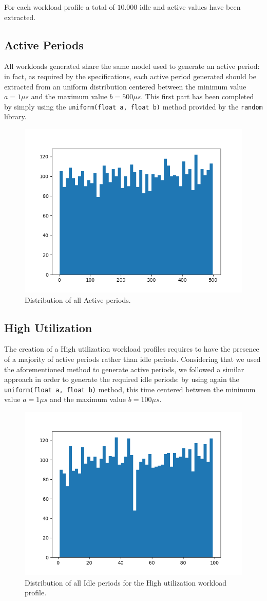 \documentclass[a4paper]{article}
\begin{document}
    For each workload profile a total of $10.000$ idle and active values have been extracted.

    \subsection{Active Periods}
        All workloads generated share the same model used to generate an active period: in fact, as required by the specifications, each active period generated should be extracted from an uniform distribution centered between the minimum value $a=1\mu s$ and the maximum value $b=500 \mu s$. This first part has been completed by simply using the \texttt{uniform(float a, float b)} method provided by the \texttt{random} library.
        \begin{figure}[htp]
            \centering
            \includegraphics[width=0.3 \columnwidth]{./screenshots/Active.png}
            \caption{
                    \label{fig:Active}
                    Distribution of all Active periods.
            }
        \end{figure}
    \subsection{High Utilization}
        The creation of a High utilization workload profiles requires to have the presence of a majority of active periods rather than idle periods. Considering that we used the aforementioned method to generate active periods, we followed a similar approach in order to generate the required idle periods: by using again the \texttt{uniform(float a, float b)} method, this time centered between the minimum value $a=1\mu s$ and the maximum value $b=100 \mu s$.
        \begin{figure}[htp]
            \centering
            \includegraphics[width=0.3 \columnwidth]{./screenshots/Idle1.png}
            \caption{
                    \label{fig:Active}
                    Distribution of all Idle periods for the High utilization workload profile.
            }
        \end{figure}
\end{document}
